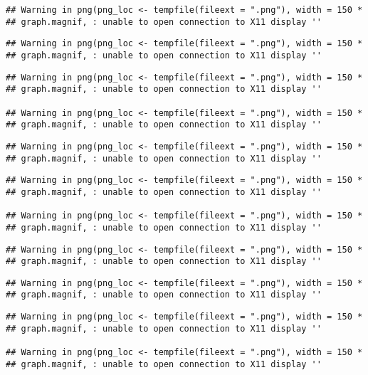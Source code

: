 \documentclass[]{article}
\begin{document}
\begin{verbatim}
## Warning in png(png_loc <- tempfile(fileext = ".png"), width = 150 *
## graph.magnif, : unable to open connection to X11 display ''
\end{verbatim}

\begin{verbatim}
## Warning in png(png_loc <- tempfile(fileext = ".png"), width = 150 *
## graph.magnif, : unable to open connection to X11 display ''
\end{verbatim}

\begin{verbatim}
## Warning in png(png_loc <- tempfile(fileext = ".png"), width = 150 *
## graph.magnif, : unable to open connection to X11 display ''

## Warning in png(png_loc <- tempfile(fileext = ".png"), width = 150 *
## graph.magnif, : unable to open connection to X11 display ''
\end{verbatim}

\begin{verbatim}
## Warning in png(png_loc <- tempfile(fileext = ".png"), width = 150 *
## graph.magnif, : unable to open connection to X11 display ''
\end{verbatim}

\begin{verbatim}
## Warning in png(png_loc <- tempfile(fileext = ".png"), width = 150 *
## graph.magnif, : unable to open connection to X11 display ''

## Warning in png(png_loc <- tempfile(fileext = ".png"), width = 150 *
## graph.magnif, : unable to open connection to X11 display ''
\end{verbatim}

\begin{verbatim}
## Warning in png(png_loc <- tempfile(fileext = ".png"), width = 150 *
## graph.magnif, : unable to open connection to X11 display ''
\end{verbatim}

\begin{verbatim}
## Warning in png(png_loc <- tempfile(fileext = ".png"), width = 150 *
## graph.magnif, : unable to open connection to X11 display ''
\end{verbatim}

\begin{verbatim}
## Warning in png(png_loc <- tempfile(fileext = ".png"), width = 150 *
## graph.magnif, : unable to open connection to X11 display ''

## Warning in png(png_loc <- tempfile(fileext = ".png"), width = 150 *
## graph.magnif, : unable to open connection to X11 display ''
\end{verbatim}
\end{document}
